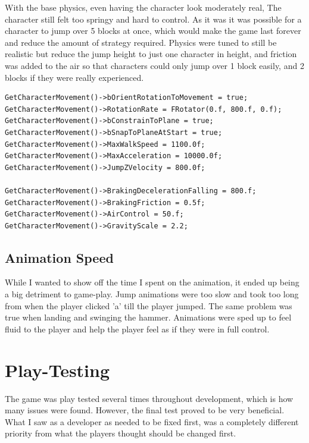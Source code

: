 \documentclass[conference,compsoc]{IEEEtran}
\begin{document}
With the base physics, even having the character look moderately real, The character still felt too springy and hard to control. As it was it was possible for a character to jump over 5 blocks at once, which would make the game last forever and reduce the amount of strategy required. Physics were tuned to still be realistic but reduce the jump height to just one character in height, and friction was added to the air so that characters could only jump over 1 block easily, and 2 blocks if they were really experienced.

\begin{lstlisting}[caption={Biggest Physics Engine Tuning Parameters}]
GetCharacterMovement()->bOrientRotationToMovement = true;
GetCharacterMovement()->RotationRate = FRotator(0.f, 800.f, 0.f);
GetCharacterMovement()->bConstrainToPlane = true;
GetCharacterMovement()->bSnapToPlaneAtStart = true;
GetCharacterMovement()->MaxWalkSpeed = 1100.0f;
GetCharacterMovement()->MaxAcceleration = 10000.0f;
GetCharacterMovement()->JumpZVelocity = 800.0f;

GetCharacterMovement()->BrakingDecelerationFalling = 800.f;
GetCharacterMovement()->BrakingFriction = 0.5f;
GetCharacterMovement()->AirControl = 50.f;
GetCharacterMovement()->GravityScale = 2.2;
\end{lstlisting}

\subsection{Animation Speed}

While I wanted to show off the time I spent on the animation, it ended up being a big detriment to game-play. Jump animations were too slow and took too long from when the player clicked 'a' till the player jumped. The same problem was true when landing and swinging the hammer. Animations were sped up to feel fluid to the player and help the player feel as if they were in full control.

\section{Play-Testing}

The game was play tested several times throughout development, which is how many issues were found. However, the final test proved to be very beneficial. What I saw as a developer as needed to be fixed first, was a completely different priority from what the players thought should be changed first.
\end{document}
